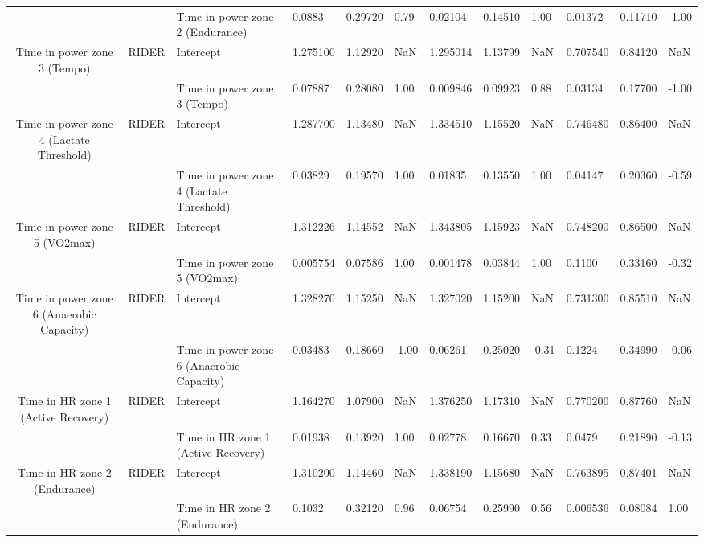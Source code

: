 \begin{tabular}{c}
                                      &       & Time in power zone 2 (Endurance) &     0.0883 &  0.29720 &  0.79 &   0.02104 &  0.14510 &  1.00 &   0.01372 &  0.11710 & -1.00 \\
Time in power zone 3 (Tempo) & RIDER & Intercept &   1.275100 &  1.12920 &   NaN &  1.295014 &  1.13799 &   NaN &  0.707540 &  0.84120 &   NaN \\
                                      &       & Time in power zone 3 (Tempo) &    0.07887 &  0.28080 &  1.00 &  0.009846 &  0.09923 &  0.88 &   0.03134 &  0.17700 & -1.00 \\
Time in power zone 4 (Lactate Threshold) & RIDER & Intercept &   1.287700 &  1.13480 &   NaN &  1.334510 &  1.15520 &   NaN &  0.746480 &  0.86400 &   NaN \\
                                      &       & Time in power zone 4 (Lactate Threshold) &    0.03829 &  0.19570 &  1.00 &   0.01835 &  0.13550 &  1.00 &   0.04147 &  0.20360 & -0.59 \\
Time in power zone 5 (VO2max) & RIDER & Intercept &   1.312226 &  1.14552 &   NaN &  1.343805 &  1.15923 &   NaN &  0.748200 &  0.86500 &   NaN \\
                                      &       & Time in power zone 5 (VO2max) &   0.005754 &  0.07586 &  1.00 &  0.001478 &  0.03844 &  1.00 &    0.1100 &  0.33160 & -0.32 \\
Time in power zone 6 (Anaerobic Capacity) & RIDER & Intercept &   1.328270 &  1.15250 &   NaN &  1.327020 &  1.15200 &   NaN &  0.731300 &  0.85510 &   NaN \\
                                      &       & Time in power zone 6 (Anaerobic Capacity) &    0.03483 &  0.18660 & -1.00 &   0.06261 &  0.25020 & -0.31 &    0.1224 &  0.34990 & -0.06 \\
Time in HR zone 1 (Active Recovery) & RIDER & Intercept &   1.164270 &  1.07900 &   NaN &  1.376250 &  1.17310 &   NaN &  0.770200 &  0.87760 &   NaN \\
                                      &       & Time in HR zone 1 (Active Recovery) &    0.01938 &  0.13920 &  1.00 &   0.02778 &  0.16670 &  0.33 &    0.0479 &  0.21890 & -0.13 \\
Time in HR zone 2 (Endurance) & RIDER & Intercept &   1.310200 &  1.14460 &   NaN &  1.338190 &  1.15680 &   NaN &  0.763895 &  0.87401 &   NaN \\
                                      &       & Time in HR zone 2 (Endurance) &     0.1032 &  0.32120 &  0.96 &   0.06754 &  0.25990 &  0.56 &  0.006536 &  0.08084 &  1.00 \\

\end{tabular}
